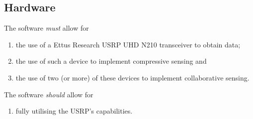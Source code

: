 \documentclass[a4paper, openany, oneside]{memoir}
\begin{document}
\subsection{Hardware}
The software \emph{must} allow for
\begin{enumerate}
    \item the use of a Ettus Research USRP UHD N210 transceiver to obtain data;
    \item the use of such a device to implement compressive sensing and
    \item the use of two (or more) of these devices to implement collaborative sensing.
\end{enumerate}

The software \emph{should} allow for
\begin{enumerate}
    \item fully utilising the USRP's capabilities.
\end{enumerate}
\end{document}
